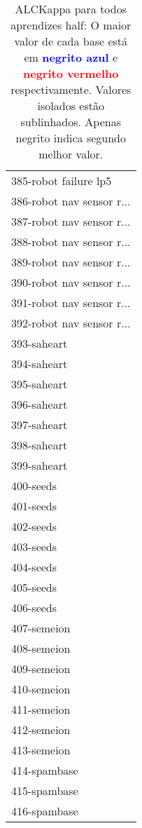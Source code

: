 \begin{table}[h]
\caption{ALCKappa para todos aprendizes half: O maior valor de cada base está em \textcolor{blue}{\textbf{negrito azul}} e \textcolor{red}{\textbf{negrito vermelho}} respectivamente. Valores isolados estão sublinhados. Apenas negrito indica segundo melhor valor.}
\begin{center}\begin{tabular}{l}
 & \\ \hline 385-robot failure lp5 &  \\
386-robot nav sensor r... &  \\
387-robot nav sensor r... &  \\
388-robot nav sensor r... &  \\
389-robot nav sensor r... &  \\
390-robot nav sensor r... &  \\
391-robot nav sensor r... &  \\ \hline
392-robot nav sensor r... &  \\
393-saheart &  \\
394-saheart &  \\
395-saheart &  \\
396-saheart &  \\
397-saheart &  \\
398-saheart &  \\ \hline
399-saheart &  \\
400-seeds &  \\
401-seeds &  \\
402-seeds &  \\
403-seeds &  \\
404-seeds &  \\
405-seeds &  \\ \hline
406-seeds &  \\
407-semeion &  \\
408-semeion &  \\
409-semeion &  \\
410-semeion &  \\
411-semeion &  \\
412-semeion &  \\ \hline
413-semeion &  \\
414-spambase &  \\
415-spambase &  \\
416-spambase &  \\\end{tabular}\label{stratsALCKappa12AllReduxHalfb}
\end{center}
\end{table}
